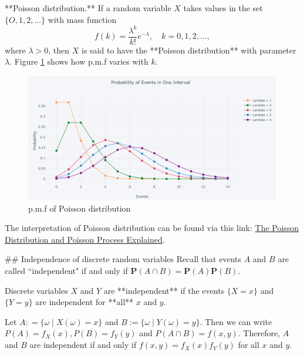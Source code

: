 \begin{example}
**Poisson distribution.** If a random variable $X$ takes values in the set $\{O, 1, 2, \dots \}$ with mass function
\begin{equation*}
    f(k) = \frac{\lambda^k}{k!} e^{-\lambda}, \quad k = 0, 1, 2, \dots, 
\end{equation*}
where $\lambda > 0$, then $X$ is said to have the **Poisson distribution** with parameter $\lambda$. Figure \ref{fig:poisson} shows how p.m.f varies with $k$.
\begin{figure}[!htb]
    \centering
    \includegraphics[scale=0.18]{plots/poisson.png}
    \caption{p.m.f of Poisson distribution}
    \label{fig:poisson}
\end{figure}

\begin{remark}
The interpretation of Poisson distribution can be found via this link: \href{https://towardsdatascience.com/the-poisson-distribution-and-poisson-process-explained-4e2cb17d459}{The Poisson Distribution and Poisson Process Explained}.
\end{remark}
\end{example}


## Independence of discrete random variables
Recall that events $A$ and $B$ are called ``independent" if and only if $\mathbf{P}(A \cap B) = \mathbf{P}(A)\mathbf{P}(B)$. 

\begin{definition}
Discrete variables $X$ and $Y$ are **independent** if the events $\{X = x\}$ and $\{Y = y\}$ are independent for **all** $x$ and $y$. 
\end{definition}

Let $A: = \{ \omega \;\vert\; X(\omega) = x \}$ and $B:= \{ \omega \;\vert\; Y(\omega) = y \}$. Then we can write $P(A) = f_X(x), P(B) = f_Y(y)$ and $P(A \cap B) = f(x, y)$. Therefore, $A$ and $B$ are independent if and only if $f(x,y) = f_X(x) f_Y(y)$ for all $x$ and $y$.

